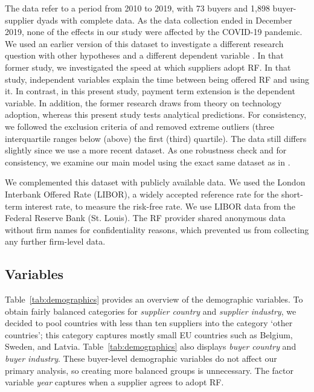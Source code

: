 \documentclass[a4paper,11pt]{article}
\renewcommand{\~}[1]{\tilde{#1}}
\renewcommand{\-}[1]{\overline{#1}}
\begin{document}
The data refer to a period from 2010 to 2019, with 73 buyers and 1,898 buyer-supplier dyads with complete data. As the data collection ended in December 2019, none of the effects in our study were affected by the COVID-19 pandemic. We used an earlier version of this dataset to investigate a different research question with other hypotheses and a different dependent variable \citep{Wuttke2019}. In that former study, we investigated the speed at which suppliers adopt RF. In that study, independent variables explain the time between being offered RF and using it. In contrast, in this present study, payment term extension is the dependent variable. In addition, the former research draws from theory on technology adoption, whereas this present study tests analytical predictions. For consistency, we followed the exclusion criteria of \citet{Wuttke2019} and removed extreme outliers (three interquartile ranges below (above) the first (third) quartile). The data still differs slightly since we use a more recent dataset. As one robustness check and for consistency, we examine our main model using the exact same dataset as in \citet{Wuttke2019}.

We complemented this dataset with publicly available data. We used the London Interbank Offered Rate (LIBOR), a widely accepted reference rate for the short-term interest rate, to measure the risk-free rate. We use LIBOR data from the Federal Reserve Bank (St. Louis). The RF provider shared anonymous data without firm names for confidentiality reasons, which prevented us from collecting any further firm-level data.

\subsection{Variables}\label{sec:variables}
Table~\ref{tab:demographics} provides an overview of the demographic variables. To obtain fairly balanced categories for \textit{supplier country} and \textit{supplier industry}, we decided to pool countries with less than ten suppliers into the category `other countries'; this category captures mostly small EU countries such as Belgium, Sweden, and Latvia. Table~\ref{tab:demographics} also displays \textit{buyer country} and \textit{buyer industry}. These buyer-level demographic variables do not affect our primary analysis, so creating more balanced groups is unnecessary. The factor variable \textit{year} captures when a supplier agrees to adopt RF.
\end{document}
